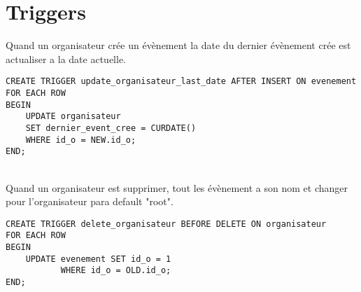 \documentclass{article}
\begin{document}
\section{Triggers}
Quand un organisateur crée un évènement la date du dernier évènement crée est actualiser a la date actuelle.
\begin{verbatim}
CREATE TRIGGER update_organisateur_last_date AFTER INSERT ON evenement
FOR EACH ROW
BEGIN
    UPDATE organisateur
    SET dernier_event_cree = CURDATE()
    WHERE id_o = NEW.id_o;
END;
\end{verbatim}
~\\
Quand un organisateur est supprimer, tout les évènement a son nom et changer pour l'organisateur para default "root".
\begin{verbatim}
CREATE TRIGGER delete_organisateur BEFORE DELETE ON organisateur
FOR EACH ROW
BEGIN	
    UPDATE evenement SET id_o = 1
           WHERE id_o = OLD.id_o;
END;
\end{verbatim}
\end{document}
